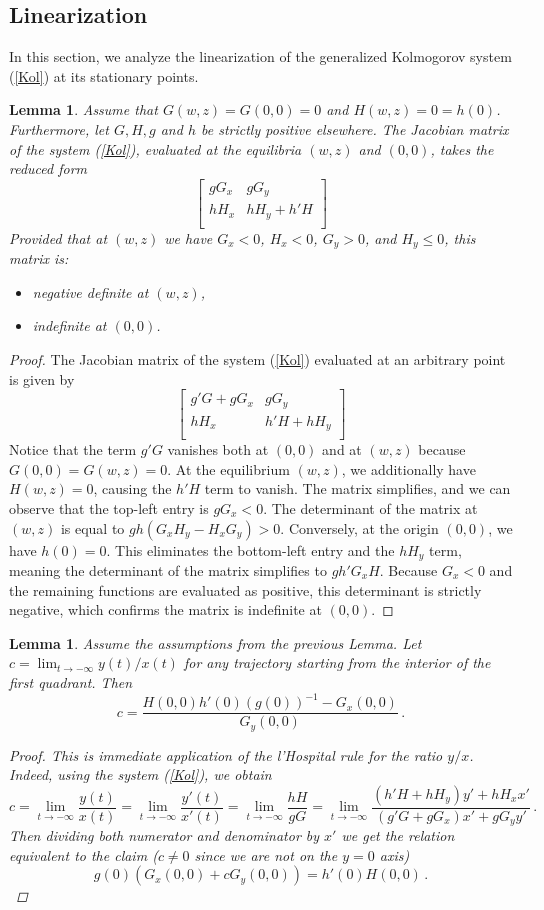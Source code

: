 \documentclass[reqno,10pt]{article}
\newtheorem{lemma}[theorem]{Lemma}
\theoremstyle{definition}
\numberwithin{equation}{section}
\numberwithin{theorem}{section}
\begin{document}
\subsection{Linearization}
In this section, we analyze the linearization of the generalized Kolmogorov system (\ref{Kol}) at its stationary points.
\begin{lemma} Assume that $G(w,z)=G(0,0)=0$ and $H(w,z)=0=h(0)$. Furthermore, let  $G,H, g$ and $h$ be strictly positive elsewhere. The Jacobian matrix of the system (\ref{Kol}), evaluated at the equilibria $(w,z)$ and $(0,0)$, takes the reduced form
\[
\begin{bmatrix}
gG_x&gG_y\\
hH_x&hH_y+h'H\\
\end{bmatrix}
\]
Provided that at $(w,z)$ we have $G_x<0$, $H_x<0$, $G_y>0$, and $H_y\le 0$, this matrix is:
\begin{itemize}
\item negative definite at $(w,z)$,
\item indefinite at $(0,0)$. 
\end{itemize}
\end{lemma}
\begin{proof}
The Jacobian matrix of the system (\ref{Kol}) evaluated at an arbitrary point is given by
\[
\begin{bmatrix}
g'G+gG_x&gG_y\\
hH_x&h'H+hH_y\\
\end{bmatrix}
\]
Notice that the term $g'G$ vanishes both at $(0,0)$ and at $(w,z)$ because $G(0,0)=G(w,z)=0$. At the equilibrium $(w,z)$, we additionally have $H(w,z)=0$, causing the $h'H$ term to vanish. The matrix simplifies, and we can observe that the top-left entry is $gG_x<0$. The determinant of the matrix at $(w,z)$ is equal to $gh(G_xH_y-H_xG_y)>0$.
Conversely, at the origin $(0,0)$, we have $h(0)=0$. This eliminates the bottom-left entry and the $hH_y$ term, meaning the determinant of the matrix simplifies to $gh'G_xH$. Because $G_x<0$ and the remaining functions are evaluated as positive, this determinant is strictly negative, which confirms the matrix is indefinite at $(0,0)$.
\end{proof}

\begin{lemma}\label{Lem}
Assume the assumptions from the previous Lemma. Let $c=\lim_{t\to -\infty}{y(t)/x(t)}$ for any trajectory starting from the interior of the first quadrant. Then
\[
c=\frac{H(0,0)h'(0)(g(0))^{-1}-G_x(0,0)}{G_y(0,0)}\,.
\]
\begin{proof}
This is immediate application of the l'Hospital rule for the ratio $y/x$. Indeed, using the system (\ref{Kol}), we obtain
\[
c=\lim_{t\to -\infty}\frac{y(t)}{x(t)}=\lim_{t\to -\infty}\frac{y'(t)}{x'(t)}=\lim_{t\to -\infty}\frac{hH}{gG}=\lim_{t\to -\infty}\frac{(h'H+hH_y)y'+hH_xx'}{(g'G+gG_x)x'+gG_yy'}\,.
\]
Then dividing both numerator and denominator by $x'$ we get the relation equivalent to the claim ($c\neq 0$ since we are not on the $y=0$ axis)
\[
g(0)(G_x(0,0)+cG_y(0,0))=h'(0)H(0,0)\,.
\]
\end{proof}
\end{lemma}
\end{document}
